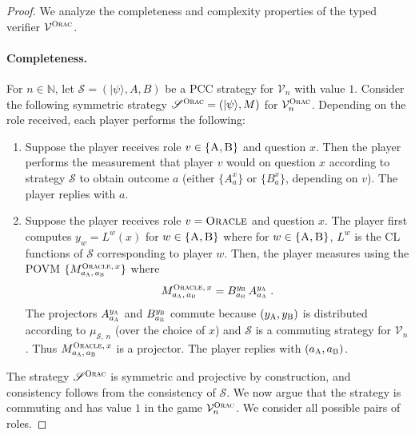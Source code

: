 \documentclass[11pt]{article}
\theoremstyle{definition}
\newcommand{\ket}[1]{|#1\rangle}
\newcommand{\N}{\ensuremath{\mathbb{N}}}
\newcommand{\sampler}{\mathcal{S}}
\newcommand{\verifier}{\mathcal{V}}
\newcommand{\strategy}{\mathscr{S}}
\newcommand{\gamestyle}[1]{\ensuremath{\textsc{#1}}\xspace}
\newcommand{\ora}{\gamestyle{Orac}}
\newcommand{\labelstyle}[1]{\ensuremath{\textsc{#1}}\xspace}
\newcommand{\alice}{\labelstyle{A}}
\newcommand{\bob}{\labelstyle{B}}
\newcommand{\oracle}{\labelstyle{Oracle}}
\newcommand{\ab}{\{\alice, \bob\}}
\newcommand{\typestyle}[1]{\ensuremath{\textsc{#1}}\xspace}
\newcommand{\Oracle}{\typestyle{Oracle}}
\begin{document}
\begin{proof}
  We analyze the completeness and complexity properties of the typed verifier
  $\verifier^\ora$.

  \paragraph{Completeness.}
  For $n \in \N$, let $\strategy = (\ket{\psi},A,B)$ be a PCC strategy for
  $\verifier_n$ with value $1$.
  Consider the following symmetric strategy $\strategy^\ora = (\ket{\psi}, M)$
  for $\verifier^\ora_n$.
  Depending on the role received, each player performs the following:
  \begin{enumerate}
	\item Suppose the player receives role $v \in \{\alice,\bob\}$ and question
    $x$.
    Then the player performs the measurement that player $v$ would on question
    $x$ according to strategy $\strategy$ to obtain outcome $a$ (either
    $\{A^{x}_a\}$ or $\{B^x_a\}$, depending on $v$).
    The player replies with $a$.
		\label{enu:oracle-honest-isolated}
		
	\item Suppose the player receives role $v = \oracle$ and question $x$.
    The player first computes $y_w = L^w(x)$ for $w \in \{\alice,\bob\}$ where
    for $w\in \ab$, $L^w$ is the CL functions of $\sampler$ corresponding to
    player $w$.
    Then, the player measures using the POVM $\{ M^{\Oracle,\, x}_{a_\alice,\,
      a_\bob}\}$ where
    \begin{equation}
      \label{eq:oracle-honest}
      M^{\oracle,\, x}_{a_\alice,\, a_\bob} = B^{y_\bob}_{a_\bob}\,
      A^{y_\alice}_{a_\alice}\;.
    \end{equation}
    The projectors $A^{y_\alice}_{a_\alice}$ and $B^{y_\bob}_{a_\bob}$
    commute because $(y_\alice, y_\bob)$ is distributed according to
    $\mu_{\sampler,\, n}$ (over the choice of $x$) and $\strategy$ is a
    commuting strategy for $\verifier_n$.
    Thus $M^{\oracle,\, x}_{a_\alice,\, a_\bob}$ is a projector.
    The player replies with $(a_\alice, a_\bob)$.
		\label{enu:oracle-honest-oracle}
  \end{enumerate}

  The strategy $\strategy^\ora$ is symmetric and projective by construction, and
  consistency follows from the consistency of $\strategy$.
  We now argue that the strategy is commuting and has value $1$ in the game
  $\verifier^\ora_n$.
  We consider all possible pairs of roles.


\end{proof}
\end{document}
